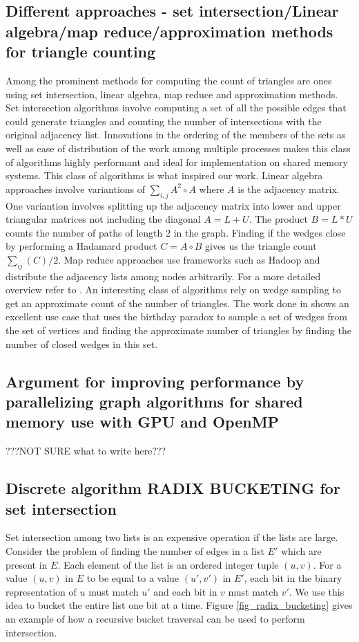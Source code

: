 \subsection{Different approaches - set intersection/Linear algebra/map reduce/approximation methods for triangle counting}
Among the prominent methods for computing the count of triangles are ones using set intersection, linear algebra, map reduce and approximation methods. Set intersection algorithms \cite{b7} involve computing a set of all the possible edges that could generate triangles and counting the number of intersections with the original adjacency list. Innovations in the ordering of the members of the sets as well as ease of distribution of the work among multiple processes makes this class of algorithms highly performant\cite{b8} and ideal for implementation on shared memory systems. This class of algorithms is what inspired our work. Linear algebra approaches involve variantions of $\sum_{i,j}A^2\circ A$ where $A$ is the adjacency matrix\cite{b6}. One variantion involves splitting up the adjacency matrix into lower and upper triangular matrices not including the diagonal $A = L + U$. The product $B = L*U$ counts the number of paths of length 2 in the graph. Finding if the wedges close by performing a Hadamard product $C= A\circ B$ gives us the triangle count $\sum_{ij}(C)/2$\cite{b10, b9}. Map reduce approaches use frameworks such as Hadoop and distribute the adjacency lists among nodes arbitrarily. For a more detailed overview refer to \cite{b11,b12}. An interesting class of algorithms rely on wedge sampling to get an approximate count of the number of triangles. The work done in \cite{b13} shows an excellent use case that uses the birthday paradox to sample a set of wedges from the set of vertices and finding the approximate number of triangles by finding the number of closed wedges in this set.

\subsection{Argument for improving performance by parallelizing graph algorithms for shared memory use with GPU and OpenMP}
???NOT SURE what to write here???

\subsection{Discrete algorithm RADIX BUCKETING for set intersection}
Set intersection among two lists is an expensive operation if the lists are large. Consider the problem of finding the number of edges in a list $E'$ which are present in $E$. Each element of the list is an ordered integer tuple $(u,v)$. For a value $(u,v)$ in $E$ to be equal to a value $(u',v')$ in $E'$, each bit in the binary representation of $u$ must match $u'$ and each bit in $v$ must match $v'$. We use this idea to bucket the entire list one bit at a time. Figure \ref{fig_radix_bucketing} gives an example of how a recursive bucket traversal can be used to perform intersection.

